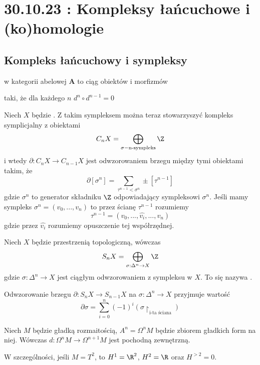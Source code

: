 \section{30.10.23 : Kompleksy łańcuchowe i (ko)homologie}

\subsection{Kompleks łańcuchowy i sympleksy}

\begin{definition}
   w kategorii abelowej $\mathbf{A}$ to ciąg obiektów i morfizmów
  \begin{center}\end{center}
  taki, że dla każdego $n$ $d^n\circ d^{n-1}=0$
\end{definition}

\begin{example}
  \item Niech $X$ będzie . Z takim sympleksem można teraz stowarzyszyć kompleks symplicjalny z obiektami
    $$C_nX=\bigoplus_{\sigma-\text{n-sympleks}}\Z$$
    i wtedy $\partial:C_nX\to C_{n-1}X$ jest odwzorowaniem brzegu między tymi obiektami takim, że
    $$\partial[\sigma^n]=\sum_{\tau^{n-1}<\sigma^n}\pm[\tau^{n-1}]$$
    gdzie $\sigma^n$ to generator składniku $\Z$ odpowiadający sympleksowi $\sigma^n$. Jeśli mamy sympleks $\sigma^n=(v_0,...,v_n)$ to przez ścianę $\tau^{n-1}$ rozumiemy
    $$\tau^{n-1}=(v_0,...,\hat{v_i},...,v_n)$$
    gdzie przez $\hat{v_i}$ rozumiemy opuszczenie tej współrzędnej.

  \item Niech $X$ będzie przestrzenią topologiczną, wówczas 
    $$S_nX=\bigoplus_{\sigma:\Delta^n\to X}\Z$$
    gdzie $\sigma:\Delta^n\to X$ jest ciągłym odwzorowaniem z sympleksu w $X$. To się nazywa .

    Odwzorowanie brzegu $\partial: S_nX\to S_{n-1}X$ na $\sigma:\Delta^n\to X$ przyjmuje wartość
    $$\partial\sigma=\sum_{i=0}^n(-1)^i(\sigma\restriction_\text{i-ta ściana})$$
    
  \item {}

    Niech $M$ będzie gładką rozmaitością, $A^n=\Omega^nM$ będzie zbiorem gładkich form na niej. Wówczas $d:\Omega^nM\to\Omega^{n+1}M$ jest pochodną zewnętrzną.

    W szczególności, jeśli $M=T^2$, to $H^1=\R^2$, $H^2=\R$ oraz $H^{>2}=0$.
\end{example}

